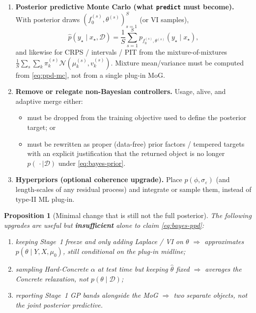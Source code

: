 \documentclass[11pt,a4paper]{article}
\theoremstyle{plain}
\newtheorem{proposition}[theorem]{Proposition}
\theoremstyle{definition}
\theoremstyle{remark}
\newcommand{\Ncal}{\mathcal{N}}
\newcommand{\D}{\mathcal{D}}
\newcommand{\tht}{\theta}
\begin{document}
\begin{enumerate}[leftmargin=1.3em,itemsep=0.35em]
  \item \textbf{Posterior predictive Monte Carlo (what \texttt{predict} must become).}
        With posterior draws \((f_0^{(s)},\tht^{(s)})_{s=1}^S\) (or VI samples),
        \begin{equation}
          \widehat{p}(y_\star\mid x_\star,\D)
          =
          \frac1S\sum_{s=1}^S
          p_{f_0^{(s)},\tht^{(s)}}(y_\star\mid x_\star),
          \label{eq:ppd-mc}
        \end{equation}
        and likewise for CRPS / intervals / PIT from the mixture-of-mixtures
        \(\frac1S\sum_s\sum_k\pi_k^{(s)}\Ncal(\mu_k^{(s)},v_k^{(s)})\).
        Mixture mean/variance must be computed from \eqref{eq:ppd-mc}, not from a
        single plug-in MoG.

  \item \textbf{Remove or relegate non-Bayesian controllers.}
        Usage, alive, and adaptive merge either:
        \begin{itemize}[leftmargin=1.1em]
          \item must be dropped from the training objective used to define the
                posterior target; or
          \item must be rewritten as proper (data-free) prior factors / tempered
                targets with an explicit justification that the returned object is
                no longer \(p(\,\cdot\mid\D)\) under \eqref{eq:bayes-prior}.
        \end{itemize}

  \item \textbf{Hyperpriors (optional coherence upgrade).}
        Place \(p(\phi,\sigma_\varepsilon)\) (and length-scales of any residual process)
        and integrate or sample them, instead of type-II ML plug-in.
\end{enumerate}

\begin{proposition}[Minimal change that is still not the full posterior]
\label{prop:partial-upgrades}
The following upgrades are useful but \textbf{insufficient} alone to claim
\eqref{eq:bayes-ppd}:
\begin{enumerate}[label=(\roman*)]
  \item keeping Stage~1 freeze and only adding Laplace / VI on \(\tht\)
        \(\Rightarrow\) approximates \(p(\tht\mid Y,X,\mu_0)\), still conditional on
        the plug-in midline;
  \item sampling Hard-Concrete \(\alpha\) at test time but keeping \(\hat\tht\) fixed
        \(\Rightarrow\) averages the Concrete relaxation, not \(p(\tht\mid\D)\);
  \item reporting Stage~1 GP bands alongside the MoG
        \(\Rightarrow\) two separate objects, not the joint posterior predictive.
\end{enumerate}
\end{proposition}
\end{document}
